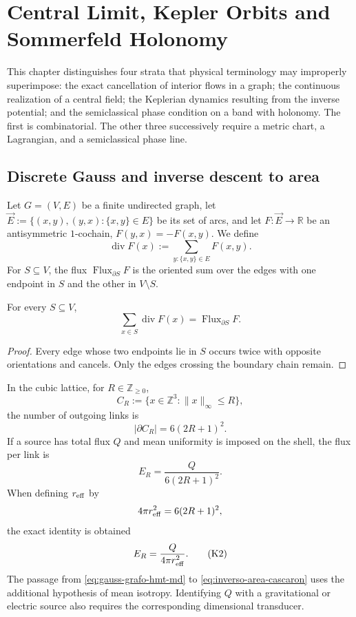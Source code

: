 \chapter{Central Limit, Kepler Orbits and Sommerfeld Holonomy}
\label{chap:limite-central-kepler-sommerfeld}

This chapter distinguishes four strata that physical terminology may improperly superimpose: the exact cancellation of interior flows in a graph; the continuous realization of a central field; the Keplerian dynamics resulting from the inverse potential; and the semiclassical phase condition on a band with holonomy. The first is combinatorial. The other three successively require a metric chart, a Lagrangian, and a semiclassical phase line.

\section{Discrete Gauss and inverse descent to area}
\label{sec:gauss-discreto-limite-central}

Let \(G=(V,E)\) be a finite undirected graph, let
\(\vec E:=\{(x,y),(y,x):\{x,y\}\in E\}\) be its set of arcs, and let
\(F:\vec E\to\mathbb R\) be an antisymmetric \(1\)-co\-chain,
\(F(y,x)=-F(x,y)\). We define
\[
 \operatorname{div}F(x)
 :=\sum_{y:\{x,y\}\in E}F(x,y).
\]
For \(S\subseteq V\), the flux
\(\operatorname{Flux}_{\partial S}F\) is the oriented sum over the edges
with one endpoint in \(S\) and the other in \(V\setminus S\).

\begin{theorem}
\label{thm:gauss-grafo-hmt-md}
For every \(S\subseteq V\),
\[
 \sum_{x\in S}\operatorname{div}F(x)
 =\operatorname{Flux}_{\partial S}F.
 \tag{K1}\label{eq:gauss-grafo-hmt-md}
\]
\end{theorem}

\begin{proof}
Every edge whose two endpoints lie in \(S\) occurs twice with opposite
orientations and cancels. Only the edges crossing the boundary chain
remain.
\end{proof}

In the cubic lattice, for \(R\in\mathbb Z_{\geq0}\),
\[
 C_R:=\{x\in\mathbb Z^3:\|x\|_\infty\leq R\},
\]
the number of outgoing links is
\[
 |\partial C_R|=6(2R+1)^2.
\]
If a source has total flux \(Q\) and mean uniformity is imposed on the
shell, the flux per link is
\[
 E_R=\frac{Q}{6(2R+1)^2}.
\]
When defining \(r_{\rm eff}\) by
\[
 4\pi r_{\rm eff}^2=6(2R+1)^2,
\]
the exact identity is obtained
\[
 E_R=\frac{Q}{4\pi r_{\rm eff}^2}.
 \tag{K2}\label{eq:inverso-area-cascaron}
\]
The passage from \eqref{eq:gauss-grafo-hmt-md} to
\eqref{eq:inverso-area-cascaron} uses the additional hypothesis of mean
isotropy. Identifying \(Q\) with a gravitational or electric source also requires
the corresponding dimensional transducer.

